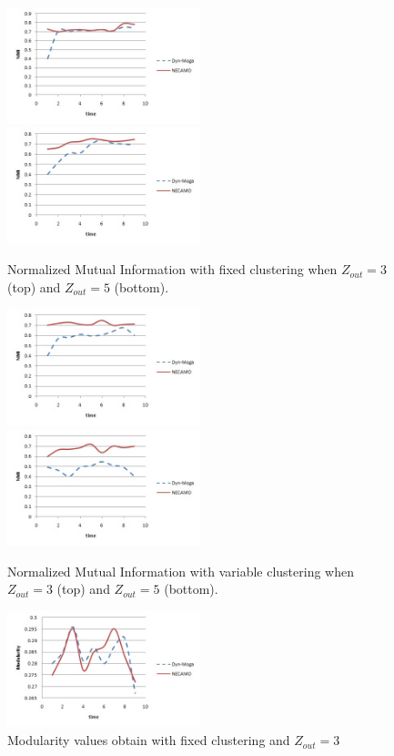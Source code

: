 \documentclass[12pt]{arsubmit}
\begin{document}
\begin{figure}
\centering
{\label {fig:NMI-zout3-fixed}\includegraphics[width=0.5\textwidth]{zout3NMI}}
{\label{fig:NMI-zout5-fixed}\includegraphics[width=0.5\textwidth]{zout5NMI}}
\caption{Normalized Mutual Information with fixed clustering when $Z_{out} = 3$ (top) and $Z_{out}= 5$ (bottom).}
\label {fig:NMI-fixed}
\end{figure}

\begin{figure}
\centering
{\label {fig:NMI-zout3-var}\includegraphics[width=0.5\textwidth]{zout3NMIvar}}
{\label{fig:NMI-zout5-var}\includegraphics[width=0.5\textwidth]{zout5NMIvar}}
\caption{Normalized Mutual Information with variable clustering when $Z_{out} = 3$ (top) and $Z_{out}= 5$ (bottom).}
\label {fig:NMI-var}
\end{figure}

\begin{figure}
\centering
\includegraphics[width=0.5\textwidth]{synth-modul}
\caption {Modularity values obtain with fixed clustering and $Z_{out} = 3$}
\label {fig:synth-modul}
\end{figure}
\end{document}
